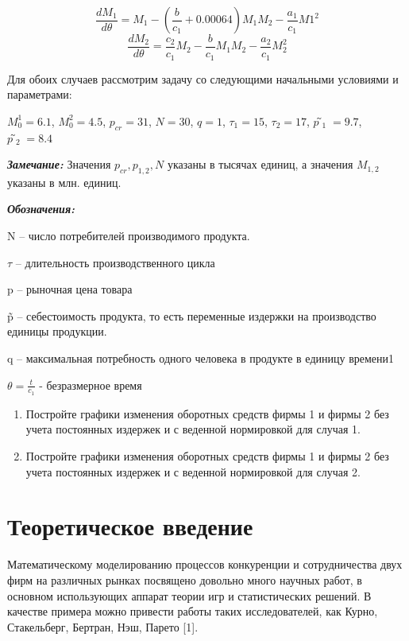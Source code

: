 \documentclass[
  12pt,
  a4paper,
  DIV=11,
  numbers=noendperiod]{scrreprt}
\begin{document}
\[
\frac{dM_1}{d\theta} = M_1 - \left(\frac{b}{c_1} + 0.00064\right)M_1M_2 - \frac{a_1}{c_1}M1^2
\] \[
\frac{dM_2}{d\theta} = \frac{c_2}{c_1}M_2 - \frac{b}{c_1}M_1M_2 - \frac{a_2}{c_1}M_2^2
\]

Для обоих случаев рассмотрим задачу со следующими начальными условиями и
параметрами:

\(M_0^1 = 6.1\), \(M_0^2 = 4.5\), \(p_{cr} = 31\), \(N = 30\),
\(q = 1\), \(\tau_1 = 15\), \(\tau_2 = 17\), \(p̃_1 = 9.7\),
\(p̃_2 = 8.4\)

\textbf{\emph{Замечание:}} Значения \(p_{cr}, p_{1,2}, N\) указаны в
тысячах единиц, а значения \(M_{1,2}\) указаны в млн. единиц.

\textbf{\emph{Обозначения:}}

N -- число потребителей производимого продукта.

\(\tau\) -- длительность производственного цикла

p -- рыночная цена товара

p̃ -- себестоимость продукта, то есть переменные издержки на производство
единицы продукции.

q -- максимальная потребность одного человека в продукте в единицу
времени1

\(\theta = \frac{t}{c_1}\) - безразмерное время

\begin{enumerate}
\def\labelenumi{\arabic{enumi}.}
\item
  Постройте графики изменения оборотных средств фирмы 1 и фирмы 2 без
  учета постоянных издержек и с веденной нормировкой для случая 1.
\item
  Постройте графики изменения оборотных средств фирмы 1 и фирмы 2 без
  учета постоянных издержек и с веденной нормировкой для случая 2.
\end{enumerate}

\chapter{Теоретическое
введение}\label{ux442ux435ux43eux440ux435ux442ux438ux447ux435ux441ux43aux43eux435-ux432ux432ux435ux434ux435ux43dux438ux435}

Математическому моделированию процессов конкуренции и сотрудничества
двух фирм на различных рынках посвящено довольно много научных работ, в
основном использующих аппарат теории игр и статистических решений. В
качестве примера можно привести работы таких исследователей, как Курно,
Стакельберг, Бертран, Нэш, Парето {[}1{]}.
\end{document}
